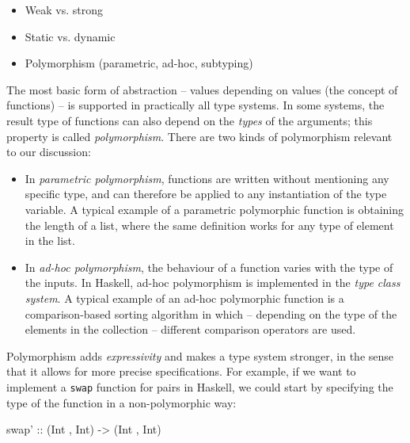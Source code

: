             \begin{itemize}
                \item Weak vs. strong
                \item Static vs. dynamic
                \item Polymorphism (parametric, ad-hoc, subtyping)
            \end{itemize}

            The most basic form of abstraction – values depending on values (the concept of functions) – is
            supported in practically all type systems.
            In some systems, the result type of functions can also depend on the \emph{types} of the arguments;
            this property is called \emph{polymorphism}.
            There are two kinds of polymorphism relevant to our discussion:

            \begin{itemize}
                \item In \emph{parametric polymorphism}, functions are written without mentioning any specific type,
                    and can therefore be applied to any instantiation of the type variable.
                    A typical example of a parametric polymorphic function is obtaining the length of a list,
                    where the same definition works for any type of element in the list.

                \item In \emph{ad-hoc polymorphism}, the behaviour of a function varies with the type of the inputs.
                    In Haskell, ad-hoc polymorphism is implemented in the \emph{type class system}.
                    A typical example of an ad-hoc polymorphic function is a comparison-based sorting algorithm
                    in which – depending on the type of the elements in the collection – different
                    comparison operators are used.
            \end{itemize}

            Polymorphism adds \emph{expressivity} and makes a type system stronger,
            in the sense that it allows for more precise specifications.
            For example, if we want to implement a \texttt{swap} function for pairs in Haskell,
            we could start by specifying the type of the function in a non-polymorphic way:
            \begin{haskellcode}
        swap' :: (Int , Int) -> (Int , Int)
            \end{haskellcode}

